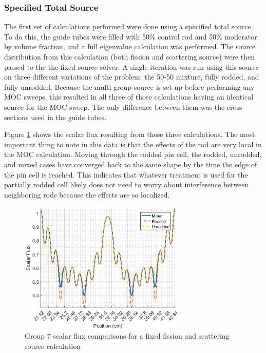 \subsubsection{Specified Total Source}

The first set of calculations performed were done using a specified total source.  To do this, the guide tubes were filled with 50\% control rod and 50\% moderator by volume fraction, and a full eigenvalue calculation was performed.  The source distribution from this calculation (both fission and scattering source) were then passed to the the fixed source solver.  A single iteration was run using this source on three different variations of the problem: the 50-50 mixture, fully rodded, and fully unrodded.  Because the multi-group source is set up before performing any MOC sweeps, this resulted in all three of those calculations having an identical source for the MOC sweep.  The only difference between them was the cross-sections used in the guide tubes.

Figure \ref{f:1dmoc-fixed-50-scalflux7} shows the scalar flux resulting from these three calculations.  The most important thing to note in this data is that the effects of the rod are very local in the MOC calculation.  Moving through the rodded pin cell, the rodded, unrodded, and mixed cases have converged back to the same shape by the time the edge of the pin cell is reached.  This indicates that whatever treatment is used for the partially rodded cell likely does not need to worry about interference between neighboring rods because the effects are so localized.

\begin{figure}[H]
  \centering
  \includegraphics[width=0.7\textwidth]{../figs/1dmoc-50mix-fixedscat-scalflux7.png}
  \caption{Group 7 scalar flux comparisons for a fixed fission and scattering source calculation}\label{f:1dmoc-fixed-50-scalflux7}
\end{figure}

